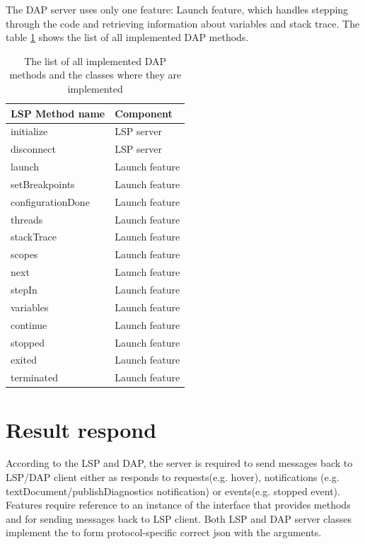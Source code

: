 The DAP server uses only one feature: Launch feature, which handles stepping through the code and retrieving information about variables and stack trace. The table \cref{DAP_methods} shows the list of all implemented DAP methods.

\begin{longtable}{ll}
	\caption{The list of all implemented DAP methods and the classes where they are implemented}
	\label{DAP_methods}   \\ \toprule
	\textbf{LSP Method name} & \textbf{Component} \\ \midrule
	initialize  & LSP server     \\
	disconnect    & LSP server     \\
	launch & Launch feature \\
	setBreakpoints  &  Launch feature    \\
	configurationDone  & Launch feature     \\
	threads  &  Launch feature    \\
	stackTrace & Launch feature \\
	scopes  & Launch feature     \\
	next  & Launch feature     \\
	stepIn  & Launch feature     \\
	variables  & Launch feature     \\
	continue  & Launch feature \\
 stopped & Launch feature \\
 exited  & Launch feature \\
 terminated & Launch feature \\\bottomrule
\end{longtable}

\section{Result respond}

According to the LSP and DAP, the server is required to send messages back to LSP/DAP client either as responds to requests(e.g. hover), notifications (e.g. textDocument/publishDiagnostics notification) or events(e.g. stopped event). Features require reference to an instance of the  interface that provides methods  and  for sending messages back to LSP client. Both LSP and DAP server classes implement the  to form protocol-specific correct json with the arguments.

